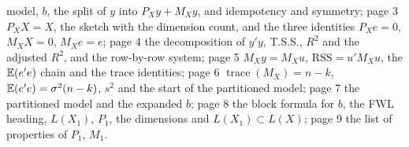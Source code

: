 \documentclass[11pt]{article}
\begin{document}
\begin{transcriptnotes}
        model, $b$, the split of $y$ into $P_{X}y + M_{X}y$, and idempotency and
        symmetry; page 3 $P_{X}X = X$, the sketch with the dimension count, and
        the three identities $P_{X}e = 0$, $M_{X}X = 0$, $M_{X}e = e$; page 4 the
        decomposition of $y'y$, T.S.S., $R^{2}$ and the adjusted $R^{2}$, and the
        row-by-row system; page 5 $M_{X}y = M_{X}u$, $\text{RSS} = u'M_{X}u$, the
        $\mathbb{E}(e'e)$ chain and the trace identities; page 6
        $\operatorname{trace}(M_{X}) = n-k$, $\mathbb{E}(e'e) = \sigma^{2}(n-k)$, $s^{2}$
        and the start of the partitioned model; page 7 the partitioned model and
        the expanded $b$; page 8 the block formula for $b$, the FWL heading,
        $L(X_{1})$, $P_{1}$, the dimensions and $L(X_{1})\subset L(X)$; page 9 the
        list of properties of $P_{1}$, $M_{1}$.
\end{transcriptnotes}
\end{document}
